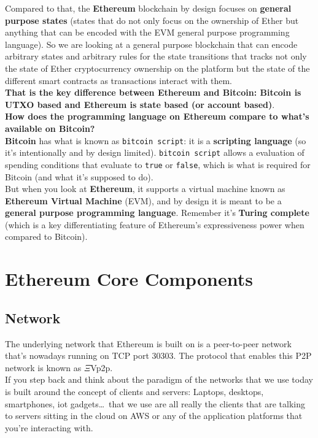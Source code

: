 Compared to that, the \textbf{Ethereum} blockchain by design focuses on \textbf{general purpose states} (states that do not only focus on the ownership of Ether but anything that can be encoded with the EVM general purpose programming language).
So we are looking at a general purpose blockchain that can encode arbitrary states and arbitrary rules for the state transitions that tracks not only the state of Ether cryptocurrency ownership on the platform but the state of the different smart contracts as transactions interact with them.\\

\textbf{That is the key difference between Ethereum and Bitcoin: Bitcoin is UTXO based and Ethereum is state based (or account based)}.\\

\textbf{How does the programming language on Ethereum compare to what's available on Bitcoin?}\\

\textbf{Bitcoin} has what is known as \texttt{bitcoin script}: it is a \textbf{scripting language} (so it's intentionally and by design limited).
\texttt{bitcoin script} allows a evaluation of spending conditions that evaluate to \texttt{true} or \texttt{false}, which is what is required for Bitcoin (and what it's supposed to do).\\

But when you look at \textbf{Ethereum}, it supports a virtual machine known as \textbf{Ethereum Virtual Machine} (EVM), and by design it is meant to be a \textbf{general purpose programming language}.
Remember it's \textbf{Turing complete} (which is a key differentiating feature of Ethereum's expressiveness power when compared to Bitcoin).

\section{Ethereum Core Components}

\subsection*{Network}

The underlying network that Ethereum is built on is a peer-to-peer network that's nowadays running on TCP port 30303.
The protocol that enables this P2P network is known as \DJ$\Xi$Vp2p.\\

If you step back and think about the paradigm of the networks that we use today is built around the concept of clients and servers: Laptops, desktops, smartphones, iot gadgets\dots\, that we use are all really the clients that are talking to servers sitting in the cloud on AWS or any of the application platforms that you're interacting with.\\

